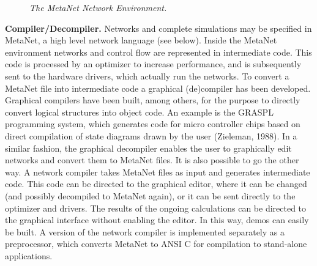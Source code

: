 \documentclass[11pt, a4paper]{article}
\begin{document}
\begin{figure}[htbp]
\caption*{\textit{The MetaNet Network Environment.}}
\end{figure}

\textbf{Compiler/Decompiler.} Networks and complete simulations may be specified in MetaNet, a high level network language (see below). Inside the MetaNet environment networks and control flow are represented in intermediate code. This code is processed by an optimizer to increase performance, and is subsequently sent to the hardware drivers, which actually run the networks. To convert a MetaNet file into intermediate code a graphical (de)compiler has been developed. Graphical compilers have been built, among others, for the purpose to directly convert logical structures into object code. An example is the GRASPL programming system, which generates code for micro controller chips based on direct compilation of state diagrams drawn by the user (Zieleman, 1988). In a similar fashion, the graphical decompiler enables the user to graphically edit networks and convert them to MetaNet files. It is also possible to go the other way. A network compiler takes MetaNet files as input and generates intermediate code. This code can be directed to the graphical editor, where it can be changed (and possibly decompiled to MetaNet again), or it can be sent directly to the optimizer and drivers. The results of the ongoing calculations can be directed to the graphical interface without enabling the editor. In this way, demos can easily be built. A version of the network compiler is implemented separately as a preprocessor, which converts MetaNet to ANSI C for compilation to stand-alone applications.
\end{document}

